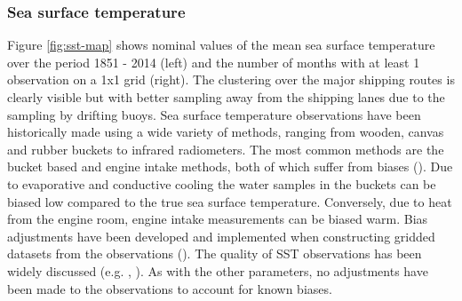 \subsubsection{Sea surface temperature}
Figure \ref{fig:sst-map} shows nominal values of the mean sea surface temperature over the period 1851 - 2014 (left) and the number of months with at least 1 observation on a 1x1 grid (right).
The clustering over the major shipping routes is clearly visible but with better sampling away from the shipping lanes due to the sampling by drifting buoys.
Sea surface temperature observations have been historically made using a wide variety of methods, ranging from wooden, canvas and rubber buckets to infrared radiometers. 
The most common methods are the bucket based and engine intake methods, both of which suffer from biases (\cite{Kent2017}). 
Due to evaporative and conductive cooling the water samples in the buckets can be biased low compared to the true sea surface temperature. 
Conversely, due to heat from the engine room, engine intake measurements can be biased warm. 
Bias adjustments have been developed and implemented when constructing gridded datasets from the observations (\cite{Kennedy2011_part2}). 
The quality of SST observations has been widely discussed (e.g. \cite{Kennedy2014}, \cite{Kent2017}).
As with the other parameters, no adjustments have been made to the observations to account for known biases.

